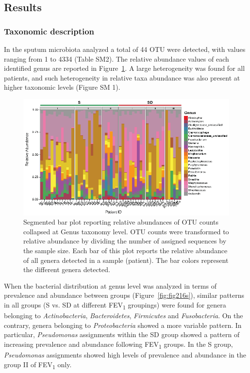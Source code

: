 \subsection{Results}
\subsubsection{Taxonomic description}
In the sputum microbiota analyzed a total of 44 OTU were detected, with values ranging from 1 to 4334 (Table SM2). The relative abundance values of each identified genus are reported in Figure~\ref{fig:fig116s}. A large heterogeneity was found for all patients, and such heterogeneity in relative taxa abundance was also present at higher taxonomic levels (Figure SM 1).\\%
\begin{figure}[!tb]
	\centering
	\includegraphics[width=1\textwidth]{./figures/Chapter_7/Figure_1_16s}
  	\caption{\label{fig:fig116s}Segmented bar plot reporting relative abundances of OTU counts collapsed at Genus taxonomy level. OTU counts were transformed to relative abundance by dividing the number of assigned sequences by the sample size. Each bar of this plot reports the relative abundance of all genera detected in a sample (patient). The bar colors represent the different genera detected.}
\end{figure}%
When the bacterial distribution at genus level was analyzed in terms of prevalence and abundance between groups (Figure~\ref{fig:fig216s}), similar patterns in all groups (S vs. SD at different FEV\textsubscript{1} groupings) were found for genera belonging to \textit{Actinobacteria}, \textit{Bacteroidetes}, \textit{Firmicutes} and \textit{Fusobacteria}. On the contrary, genera belonging to \textit{Proteobacteria }showed a more variable pattern. In particular, \textit{Pseudomonas} assignments within the SD group showed a pattern of increasing prevalence and abundance following FEV\textsubscript{1} groups. In the S group, \textit{Pseudomonas} assignments showed high levels of prevalence and abundance in the group II of FEV\textsubscript{1} only.\\%
